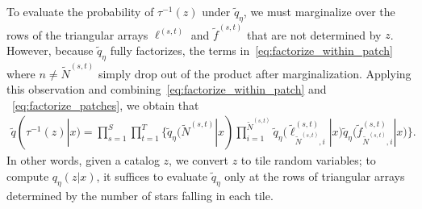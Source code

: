 To evaluate the probability of $\tau^{-1}(z)$ under $\tilde q_\eta$, we must marginalize over the rows of the triangular arrays $\ell^{(s, t)}$ and $\tilde f^{(s, t)}$ that are not determined by $z$. However, 
because $\tilde q_\eta$ fully factorizes, the terms 
in~\eqref{eq:factorize_within_patch} where $n \not= \tilde N^{(s,t)}$ simply drop out of the product
after marginalization.
Applying this observation and combining~\eqref{eq:factorize_within_patch} and ~\eqref{eq:factorize_patches}, we obtain that
\begin{align}
    \tilde q(\tau^{-1}(z) | x) = \prod_{s=1}^S\prod_{t=1}^T
    \Big\{
    \tilde q_\eta(\tilde N^{(s,t)} | x) 
    \prod_{i = 1}^{\tilde N^{(s,t)}}
    \tilde q_\eta\big(\tilde \ell_{\tilde N^{(s,t)},i}^{(s, t)} | x\big)
    \tilde q_\eta\big(\tilde f_{\tilde N^{(s,t)},i}^{(s, t)} | x\big)
    \Big\}.
\end{align}
In other words, given a catalog $z$,
we convert $z$ to tile random variables;
to compute $q_\eta(z | x)$, it suffices to evaluate $\tilde q_\eta$ only at the rows of triangular 
arrays determined by the number 
of stars falling in each tile. 



